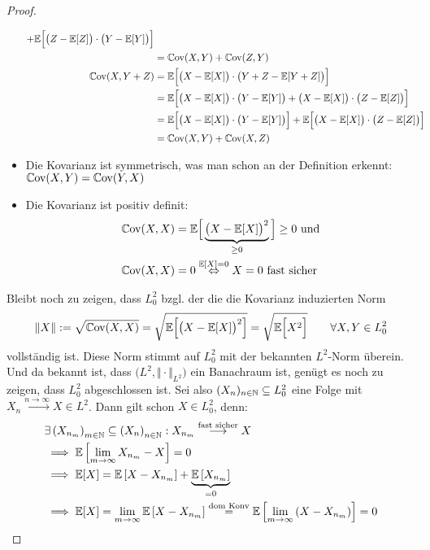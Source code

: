 \documentclass[12pt,a4paper]{article}
\begin{document}
\begin{proof}
\begin{itemize}
\begin{align*}
+\mathbb{E}\Big[\big(Z-\mathbb{E}[Z]\big)\cdot\big(Y-\mathbb{E}[Y]\big)\Big]\\
&=\mathbb{C}\text{ov}(X,Y)+\mathbb{C}\text{ov}(Z,Y)\\
\mathbb{C}\text{ov}(X,Y+Z)
&=\mathbb{E}\Big[\big(X-\mathbb{E}[X]\big)\cdot\big(Y+Z-\mathbb{E}[Y+Z]\big)\Big]\\
&=\mathbb{E}\Big[\big(X-\mathbb{E}[X]\big)\cdot\big(Y-\mathbb{E}[Y]\big)+\big(X-\mathbb{E}[X]\big)\cdot\big(Z-\mathbb{E}[Z]\big)\Big]\\
&=\mathbb{E}\Big[\big(X-\mathbb{E}[X]\big)\cdot\big(Y-\mathbb{E}[Y]\big)\Big]
+\mathbb{E}\Big[\big(X-\mathbb{E}[X]\big)\cdot\big(Z-\mathbb{E}[Z]\big)\Big]\\
&=\mathbb{C}\text{ov}(X,Y)+\mathbb{C}\text{ov}(X,Z)
\end{align*}
\item Die Kovarianz ist symmetrisch, was man schon an der Definition erkennt: $\mathbb{C}\text{ov}(X,Y)=\mathbb{C}\text{ov}(Y,X)$
\item Die Kovarianz ist positiv definit:
\begin{align*}
\mathbb{C}\text{ov}(X,X)&=\mathbb{E}\Big[\underbrace{\big(X-\mathbb{E}[X]\big)^2}_{\geq0}\Big]\geq0\text{ und}\\
\mathbb{C}\text{ov}(X,X)&=0\stackrel{\mathbb{E}[X]=0}{\Leftrightarrow} X=0\text{ fast sicher}
\end{align*}
\end{itemize}
Bleibt noch zu zeigen, dass $L_0^2$ bzgl. der die die Kovarianz induzierten Norm
\begin{align*}
\Vert X\Vert:=\sqrt{\mathbb{C}\text{ov}(X,X)}
=\sqrt{\mathbb{E}\Big[\big(X-\mathbb{E}[X]\big)^2\Big]}
=\sqrt{\mathbb{E}\Big[X^2\Big]}
\qquad\forall X,Y\in L_0^2
\end{align*}
vollständig ist. Diese Norm stimmt auf $L_0^2$ mit der bekannten $L^2$-Norm überein. Und da bekannt ist, dass $\big(L^2,\Vert\cdot\Vert_{L^2}\big)$ ein Banachraum ist, genügt es noch zu zeigen, dass $L_0^2$ abgeschlossen ist.
Sei also $(X_n)_{n\in\mathbb{N}}\subseteq L_0^2$ eine Folge mit
$X_n\stackrel{n\to\infty}{\longrightarrow}X\in L^2$.
Dann gilt schon $X\in L_0^2$, denn:
\begin{align*}
&\exists\left(X_{n_m}\right)_{m\in\mathbb{N}}\subseteq\left(X_n\right)_{n\in\mathbb{N}}:X_{n_m}\stackrel{\text{fast sicher}}{\longrightarrow}X\\
&\implies\mathbb{E}\left[\lim\limits_{m\to\infty}X_{n_m}-X\right]=0\\
&\implies
\mathbb{E}[X]=\mathbb{E}\left[X-X_{n_m}\right]+\underbrace{\mathbb{E}\left[X_{n_m}\right]}_{=0}\\
&\implies
\mathbb{E}[X]=\lim\limits_{m\to\infty}\mathbb{E}\left[X-X_{n_m}\right]
\stackrel{\text{dom Konv}}{=}
\mathbb{E}\left[\lim\limits_{m\to\infty}\left(X-X_{n_m}\right)\right]
=0
\end{align*}


\end{proof}
\end{document}
